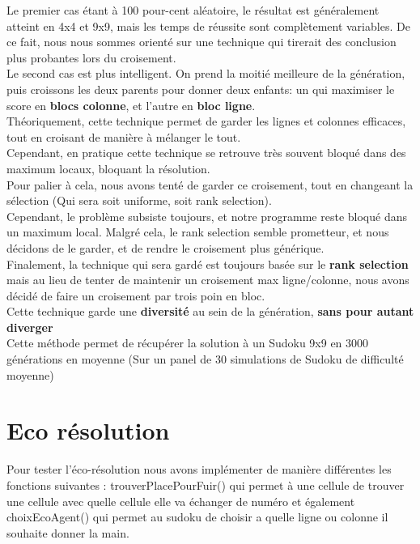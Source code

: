         Le premier cas étant à 100 pour-cent aléatoire, le résultat est généralement atteint en 4x4 et 9x9, mais les temps de réussite sont complètement variables. De ce fait, nous nous sommes orienté sur une technique qui tirerait des conclusion plus probantes lors du croisement.\\

        Le second cas est plus intelligent. On prend la moitié meilleure de la génération, puis croissons les deux parents pour donner deux enfants: un qui maximiser le score en \textbf{blocs colonne}, et l'autre en \textbf{bloc ligne}.\\
        Théoriquement, cette technique permet de garder les lignes et colonnes efficaces, tout en croisant de manière à mélanger le tout.\\
        Cependant, en pratique cette technique se retrouve très souvent bloqué dans des maximum locaux, bloquant la résolution.\\
        Pour palier à cela, nous avons tenté de garder ce croisement, tout en changeant la sélection (Qui sera soit uniforme, soit rank selection).\\
        Cependant, le problème subsiste toujours, et notre programme reste bloqué dans un maximum local. Malgré cela, le rank selection semble prometteur, et nous décidons de le garder, et de rendre le croisement plus générique.\\

        Finalement, la technique qui sera gardé est toujours basée sur le \textbf{rank selection} mais au lieu de tenter de maintenir un croisement max ligne/colonne, nous avons décidé de faire un croisement par trois poin en bloc.\\
        Cette technique garde une \textbf{diversité} au sein de la génération, \textbf{sans pour autant diverger}\\
        Cette méthode permet de récupérer la solution à un Sudoku 9x9 en 3000 générations en moyenne (Sur un panel de 30 simulations de Sudoku de difficulté moyenne)

    \section{Eco résolution}
	Pour tester l'éco-résolution nous avons implémenter de manière différentes les fonctions suivantes : trouverPlacePourFuir() qui permet à une cellule de trouver une cellule avec quelle cellule elle va échanger de numéro et également choixEcoAgent() qui permet au sudoku de choisir a quelle ligne ou colonne il souhaite donner la main. \\

